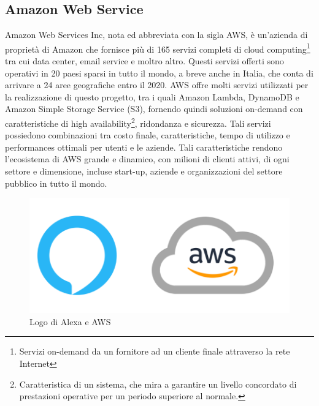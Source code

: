 \subsection{Amazon Web Service}
Amazon Web Services Inc, nota ed abbreviata con la sigla AWS, è un'azienda di proprietà di Amazon che fornisce più di 165 servizi completi di cloud computing\footnote{Servizi on-demand da un fornitore ad un cliente finale attraverso la rete Internet} tra cui data center, email service e moltro altro. Questi servizi offerti sono operativi in 20 paesi sparsi in tutto il mondo, a breve anche in Italia, che conta di arrivare a 24 aree geografiche entro il 2020. AWS offre molti servizi utilizzati per la realizzazione di questo progetto, tra i quali Amazon Lambda, DynamoDB e Amazon Simple Storage Service (S3), fornendo quindi soluzioni on-demand con caratteristiche di high availability\footnote{Caratteristica di un sistema, che mira a garantire un livello concordato di prestazioni operative per un periodo superiore al normale.}, ridondanza e sicurezza. Tali servizi possiedono combinazioni tra costo finale, caratteristiche, tempo di utilizzo e performances ottimali per utenti e le aziende. Tali caratteristiche rendono l'ecosistema di AWS grande e dinamico, con milioni di clienti attivi, di ogni settore e dimensione, incluse start-up, aziende e organizzazioni del settore pubblico in tutto il mondo.
\begin{figure}[H] 
    \centering 
    \includegraphics[width=0.8\columnwidth]{immagini/alexa_awspng.png}
    \caption{\label{fig:alexa_aws}Logo di Alexa e AWS}
\end{figure}


